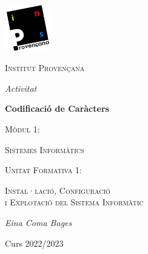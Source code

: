 \begin{titlepage}
	\centering
	\includegraphics*[width=0.15\textwidth]{provencana_color.pdf}
	\par\vspace{0.5cm}

	{\scshape\Large Institut Provençana \par}

	\vspace{1cm}
	
	{\itshape\Large Activitat \par}
	{\bfseries\LARGE Codificació de Caràcters \par}
	
	\vspace{1cm}

	{\scshape\large Mòdul 1: \par}
	{\scshape\Large Sistemes Informàtics \par}

	\vspace{0.5cm}
	
	{\scshape\normalsize Unitat Formativa 1: \par}
	{\scshape\large Instal·lació, Configuració \\ i Explotació del Sistema Informàtic\par}

	\vfill
	{\Large\itshape Eina Coma Bages\par}
	
	\vfill
	Curs 2022/2023
\end{titlepage}